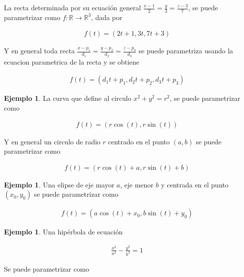 \documentclass{article}
\theoremstyle{plain}
\theoremstyle{definition}
\newtheorem{ejem}[thm]{Ejemplo}
\begin{document}
 La recta determinada por su ecuación general $ \displaystyle \frac{x-1}{2} = \frac{y}{3} = \frac{z-3}{7}$, se puede parametrizar como $f: \mathbb{R} \to \mathbb{R}^3$, dada por

\begin{align*}
f(t) = \left( 2t+1, 3t, 7t+3\right)
\end{align*}

Y en general toda recta $ \displaystyle \frac{x-p_1}{d_1} = \frac{y-p_2}{d_2} = \frac{z-p_3}{d_3}$ se puede parametriza usando la ecuacion parametrica de la recta y se obtiene


\begin{align*}
f(t) = \left( d_1t+p_1, d_2t+p_2, d_3t+p_3\right)
\end{align*}








\begin{ejem}La curva que define al circulo $x^2+y^2 = r^2$, se puede parametrizar como
\end{ejem}


\begin{align*}
f(t) = \left( r\cos(t), r\sin(t) \right)
\end{align*}



Y en general un circulo de radio $r$ centrado en el punto $(a,b) $ se puede parametrizar como


\begin{align*}
f(t) = \left( r\cos(t)+a, r\sin(t)+b \right)
\end{align*}


\begin{ejem}Una  elipse de eje mayor $a$, eje menor $b$ y centrada en el punto $(x_0,y_0) $ se puede parametrizar como
\end{ejem}


\begin{align*}
f(t) = \left( a\cos(t)+x_0, b\sin(t)+y_0 \right)
\end{align*}

\begin{ejem}Una  hipérbola de ecuación
\end{ejem}

\begin{align*}
    \frac{x^2}{a^2}-\frac{y^2}{b^2}=1
\end{align*}

Se puede parametrizar como
\end{document}
